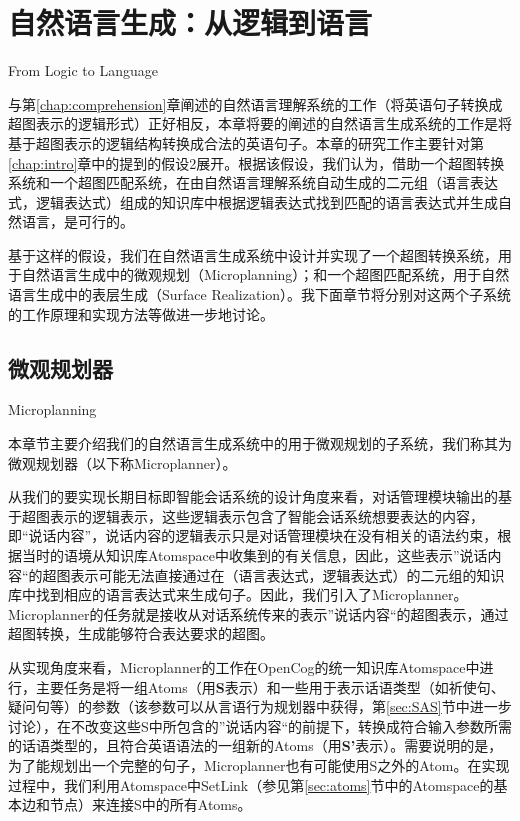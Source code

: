 \chapter{自然语言生成：从逻辑到语言}{From Logic to Language}
\label{chap:generation}

与第\ref{chap:comprehension}章阐述的自然语言理解系统的工作（将英语句子转换成超图表示的逻辑形式）正好相反，本章将要的阐述的自然语言生成系统的工作是将基于超图表示的逻辑结构转换成合法的英语句子。本章的研究工作主要针对第\ref{chap:intro}章中的提到的假设2展开。根据该假设，我们认为，借助一个超图转换系统和一个超图匹配系统，在由自然语言理解系统自动生成的二元组（语言表达式，逻辑表达式）组成的知识库中根据逻辑表达式找到匹配的语言表达式并生成自然语言，是可行的。

基于这样的假设，我们在自然语言生成系统中设计并实现了一个超图转换系统，用于自然语言生成中的微观规划（Microplanning）；和一个超图匹配系统，用于自然语言生成中的表层生成（Surface Realization）。我下面章节将分别对这两个子系统的工作原理和实现方法等做进一步地讨论。

\section{微观规划器}{Microplanning}

本章节主要介绍我们的自然语言生成系统中的用于微观规划的子系统，我们称其为微观规划器（以下称Microplanner）。

从我们的要实现长期目标即智能会话系统的设计角度来看，对话管理模块输出的基于超图表示的逻辑表示，这些逻辑表示包含了智能会话系统想要表达的内容，即“说话内容”，说话内容的逻辑表示只是对话管理模块在没有相关的语法约束，根据当时的语境从知识库Atomspace中收集到的有关信息，因此，这些表示”说话内容“的超图表示可能无法直接通过在（语言表达式，逻辑表达式）的二元组的知识库中找到相应的语言表达式来生成句子。因此，我们引入了Microplanner。Microplanner的任务就是接收从对话系统传来的表示”说话内容“的超图表示，通过超图转换，生成能够符合表达要求的超图。

从实现角度来看，Microplanner的工作在OpenCog的统一知识库Atomspace中进行，主要任务是将一组Atoms（用{\bf S}表示）和一些用于表示话语类型（如祈使句、疑问句等）的参数（该参数可以从言语行为规划器中获得，第\ref{sec:SAS}节中进一步讨论），在不改变这些S中所包含的”说话内容“的前提下，转换成符合输入参数所需的话语类型的，且符合英语语法的一组新的Atoms（用{\bf S'}表示）。需要说明的是，为了能规划出一个完整的句子，Microplanner也有可能使用S之外的Atom。在实现过程中，我们利用Atomspace中SetLink（参见第\ref{sec:atoms}节中的Atomspace的基本边和节点）来连接S中的所有Atoms。

